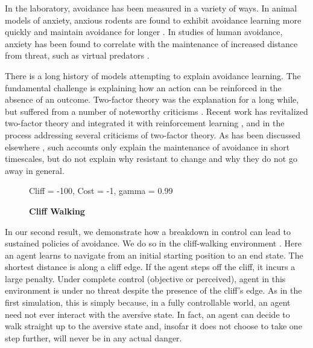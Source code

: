 \documentclass[11pt]{article} %
\begin{document}
In the laboratory, avoidance has been measured in a variety of ways. In animal
models of anxiety, anxious rodents are found to exhibit avoidance learning more
quickly and maintain avoidance for longer \citep{servatius2008}. In studies of
human avoidance, anxiety has been found to correlate with the maintenance of
increased distance from threat, such as virtual predators \citep{Bach2014, Bach2017,
Sheynin2014}.


There is a long history of models attempting to explain avoidance learning. The
fundamental challenge is explaining how an action can be reinforced in the
absence of an outcome. Two-factor theory was the explanation for a long while,
but suffered from a number of noteworthy criticisms \citep{Krypotos2015}.
Recent work has revitalized two-factor theory and integrated it with reinforcement
learning \citep{Moutoussis2008, Maia2010}, and in the process addressing several
criticisms of two-factor theory. As has been discussed elsewhere \citep{Moutoussis2017},
such accounts only explain the maintenance of avoidance in short timescales, but
do not explain why resistant to change and why they do not go away in general.


\begin{figure}
  \centerline{%
  }
  \caption{\textbf{Cliff Walking}}
  \par Cliff = -100, Cost = -1, gamma = 0.99
\end{figure}

In our second result, we demonstrate how a breakdown in control can lead to
sustained policies of avoidance. We do so in the cliff-walking environment
\citep{SuttonBarto1998, SuttonBarto2018, Gaskett2003}. Here an agent learns to navigate from
an initial starting position to an end state. The shortest distance is along a
cliff edge. If the agent steps off the cliff, it incurs a large penalty. Under
complete control (objective or perceived), agent in this environment is under no
threat despite the presence of the cliff's edge. As in the first simulation, this
is simply because, in a fully controllable world, an agent need not ever interact
with the aversive state. In fact, an agent can decide to walk straight up to the
aversive state and, insofar it does not choose to take one step further, will
never be in any actual danger.
\end{document}
